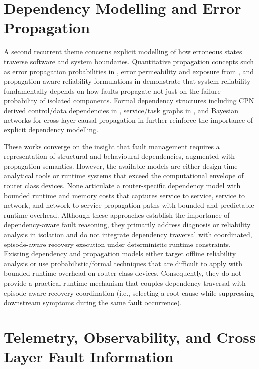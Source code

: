 \section{Dependency Modelling and Error Propagation}\label{sec:lit-dependency-modelling}

A second recurrent theme concerns explicit modelling of how erroneous states traverse software and system boundaries. Quantitative propagation concepts such as error propagation probabilities in \cite{ref7}, error permeability and exposure from \cite{ref8}, and propagation aware reliability formulations in \cite{ref9} demonstrate that system reliability fundamentally depends on how faults propagate not just on the failure probability of isolated components. Formal dependency structures including CPN derived control/data dependencies in \cite{ref10}, service/task graphs in \cite{ref11}, and Bayesian networks for cross layer causal propagation in \cite{ref12} further reinforce the importance of explicit dependency modelling.

These works converge on the insight that fault management requires a representation of structural and behavioural dependencies, augmented with propagation semantics. However, the available models are either design time analytical tools or runtime systems that exceed the computational envelope of router class devices. None articulate a router-specific dependency model with bounded runtime and memory costs that captures service to service, service to network, and network to service propagation paths with bounded and predictable runtime overhead. Although these approaches establish the importance of dependency-aware fault reasoning, they primarily address diagnosis or reliability analysis in isolation and do not integrate dependency traversal with coordinated, episode-aware recovery execution under deterministic runtime constraints. Existing dependency and propagation models either target offline reliability analysis or use probabilistic/formal techniques that are difficult to apply with bounded runtime overhead on router-class devices. Consequently, they do not provide a practical runtime mechanism that couples dependency traversal with episode-aware recovery coordination (i.e., selecting a root cause while suppressing downstream symptoms during the same fault occurrence).

\section{Telemetry, Observability, and Cross Layer Fault Information}\label{sec:lit-telemetry}

